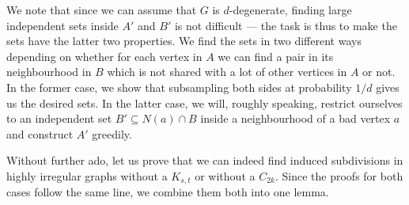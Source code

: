 \documentclass[10pt, a4paper]{article}
\numberwithin{theorem}{section} %
\theoremstyle{remark}
\theoremstyle{definition}
\begin{document}
We note that since we can assume that $G$ is $d$-degenerate, finding large independent sets inside $A'$ and $B'$ is not difficult --- the task is thus to make the sets have the latter two properties.
We find the sets in two different ways depending on whether for each vertex in $A$ we can find a pair in its neighbourhood in $B$ which is not shared with a lot of other vertices in $A$ or not.
In the former case, we show that subsampling both sides at probability $1/d$ gives us the desired sets.
In the latter case, we will, roughly speaking, restrict ourselves to an independent set $B' \subseteq N(a) \cap B$ inside a neighbourhood of a bad vertex $a$ and construct $A'$ greedily.

Without further ado, let us prove that we can indeed find induced subdivisions in highly irregular graphs without a $K_{s, t}$ or without a $C_{2k}$.
Since the proofs for both cases follow the same line, we combine them both into one lemma.
\end{document}
